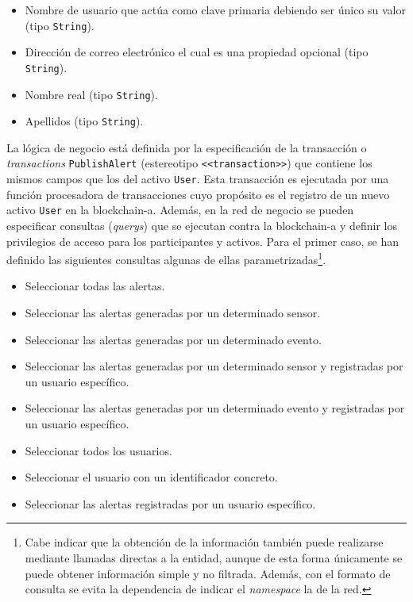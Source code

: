 \documentclass[12pt,a4paper, twoside]{report}
\begin{document}
		\begin{itemize}
			\item Nombre de usuario que actúa como clave primaria debiendo ser único su valor (tipo \texttt{String}). 
			\item Dirección de correo electrónico el cual es una propiedad opcional (tipo \texttt{String}).
			\item Nombre real (tipo \texttt{String}).
			\item Apellidos (tipo \texttt{String}).
		\end{itemize}
			
	La lógica de negocio está definida por la especificación de la transacción o \textit{\glspl{transaction}} \texttt{PublishAlert} (estereotipo \texttt{<<transaction>>}) que contiene los mismos campos que los del activo \texttt{User}. Esta transacción es ejecutada por una función procesadora de transacciones cuyo propósito es el registro de un nuevo activo \texttt{User} en la \gls{blockchain-a}. Además, en la red de negocio se pueden especificar consultas (\textit{querys}) que se ejecutan contra la \gls{blockchain-a} y definir los privilegios de acceso para los participantes y activos. Para el primer caso, se han definido las siguientes consultas algunas de ellas parametrizadas\footnote{Cabe indicar que la obtención de la información también puede realizarse mediante llamadas directas a la entidad, aunque de esta forma únicamente se puede obtener información simple y no filtrada. Además, con el formato de consulta se evita la dependencia de indicar el \textit{namespace} la de la red.}.
	
	\begin{itemize}
		\item Seleccionar todas las alertas.
		\item Seleccionar las alertas generadas por un determinado sensor.
		\item Seleccionar las alertas generadas por un determinado evento.
		\item Seleccionar las alertas generadas por un determinado sensor y registradas por un usuario específico.
		\item Seleccionar las alertas generadas por un determinado evento y registradas por un usuario específico.
		\item Seleccionar todos los usuarios.
		\item Seleccionar el usuario con un identificador concreto.
		\item Seleccionar las alertas registradas por un usuario específico.
	\end{itemize}
\end{document}
